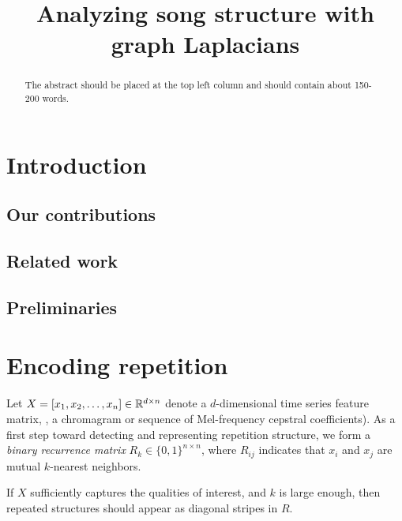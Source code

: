 \documentclass{article}
\title{Analyzing song structure with graph Laplacians}
\begin{document}
%
\maketitle
%
\begin{abstract}
The abstract should be placed at the top left column and should contain about 150-200 words.
\end{abstract}
%
\section{Introduction}\label{sec:introduction}

\subsection{Our contributions}

\subsection{Related work}

\cite{serra2012unsupervised}

\cite{grohganz2013converting}

\subsection{Preliminaries}
\section{Encoding repetition}

Let $X = [x_1, x_2, \dots, x_n] \in \mathbb{R}^{d\times n}$ denote a $d$-dimensional time
series feature matrix, \eg, a chromagram or sequence of Mel-frequency cepstral 
coefficients).  As a first step toward detecting and representing repetition structure, 
we form a \emph{binary recurrence matrix} $R_k \in \{0,1\}^{n\times n}$, where $R_{ij}$ 
indicates that $x_i$ and $x_j$ are mutual $k$-nearest neighbors.

If $X$ sufficiently captures the qualities of interest, and $k$ is large
enough, then repeated structures should appear as diagonal stripes in $R$.  
\end{document}
